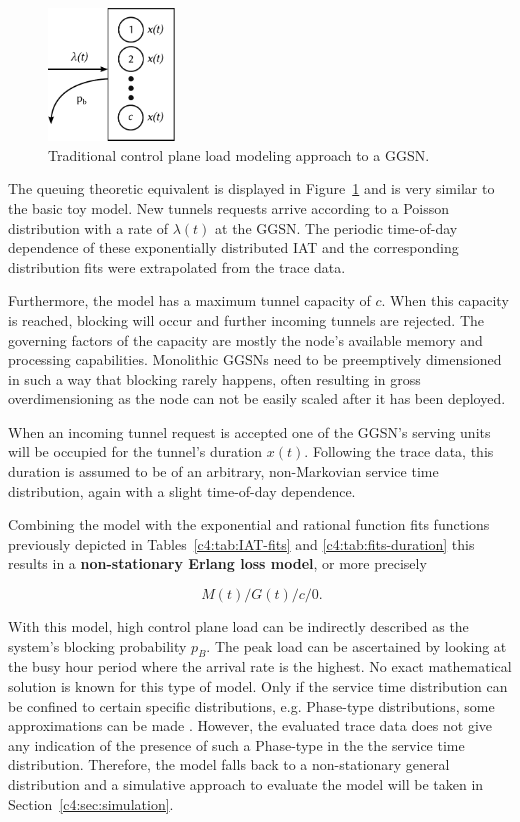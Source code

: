 \begin{figure}[htb]
	\centering
	\includegraphics[width=0.3\textwidth]{images/ggsn-monolithic.pdf}
	\caption{Traditional control plane load modeling approach to a \acrshort{GGSN}.}
\label{c4:fig:model-ggsn-monolithic}
\end{figure}

The queuing theoretic equivalent is displayed in Figure~\ref{c4:fig:model-ggsn-monolithic} and is very similar to the basic toy model. New tunnels requests arrive according to a Poisson distribution with a rate of $\lambda(t)$ at the \gls{GGSN}. The periodic time-of-day dependence of these exponentially distributed \gls{IAT} and the corresponding distribution fits were extrapolated from the trace data.

Furthermore, the model has a maximum tunnel capacity of $c$. When this capacity is reached, blocking will occur and further incoming tunnels are rejected. The governing factors of the capacity are mostly the node's available memory and processing capabilities. Monolithic \glspl{GGSN} need to be preemptively dimensioned in such a way that blocking rarely happens, often resulting in gross overdimensioning as the node can not be easily scaled after it has been deployed.

When an incoming tunnel request is accepted one of the \gls{GGSN}'s serving units will be occupied for the tunnel's duration $x(t)$. Following the trace data, this duration is assumed to be of an arbitrary, non-Markovian service time distribution, again with a slight time-of-day dependence.

Combining the model with the exponential and rational function fits functions previously depicted in Tables~\ref{c4:tab:IAT-fits} and \ref{c4:tab:fits-duration} this results in a \textbf{non-stationary Erlang loss model}, or more precisely

\begin{equation}
	\phantom{.}M(t)/G(t)/c/0\text{.}
\end{equation}

With this model, high control plane load can be indirectly described as the system's blocking probability $p_B$. The peak load can be ascertained by looking at the busy hour period where the arrival rate is the highest. No exact mathematical solution is known for this type of model. Only if the service time distribution can be confined to certain specific distributions, e.g. Phase-type distributions, some approximations can be made \cite{davis1995nonstationaryerlang}. 
However, the evaluated trace data does not give any indication of the presence of such a Phase-type in the the service time distribution. Therefore, the model falls back to a non-stationary general distribution  and a simulative approach to evaluate the model will be taken in Section~\ref{c4:sec:simulation}.


